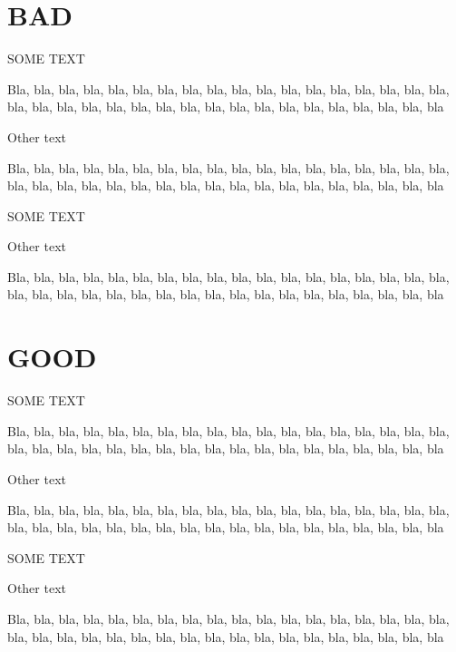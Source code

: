 \documentclass{article}
\newcommand\blabla{
    	Bla, bla, bla, bla, bla, bla, bla, bla, bla, bla, bla, bla,
    	bla, bla, bla, bla, bla, bla, bla, bla, bla, bla, bla, bla,
    	bla, bla, bla, bla, bla, bla, bla, bla, bla, bla, bla, bla
    }
\newcommand{\spacebeforebad}{\par \bigskip \par}
\newcommand\spaceafterbad{\par \medskip \par}
\newcommand\specialtextbad[1]{
    	\spacebeforebad
    	#1
		\spaceafterbad
	}
\newcommand\spacebefore{\par\addvspace{\bigskipamount}}
\newcommand\spaceafter{\par\addvspace{\medskipamount}}
\newcommand\specialtext[1]{
    	\spacebefore
    	#1
		\spaceafter
	}
\begin{document}
\section{BAD}

\specialtextbad{SOME TEXT}

\blabla{}

\specialtextbad{Other text}

\blabla{}


\specialtextbad{SOME TEXT}

\specialtextbad{Other text}

\blabla{}



\section{GOOD}

\specialtext{SOME TEXT}

\blabla{}

\specialtext{Other text}

\blabla{}


\specialtext{SOME TEXT}

\specialtext{Other text}

\blabla{}
\end{document}
